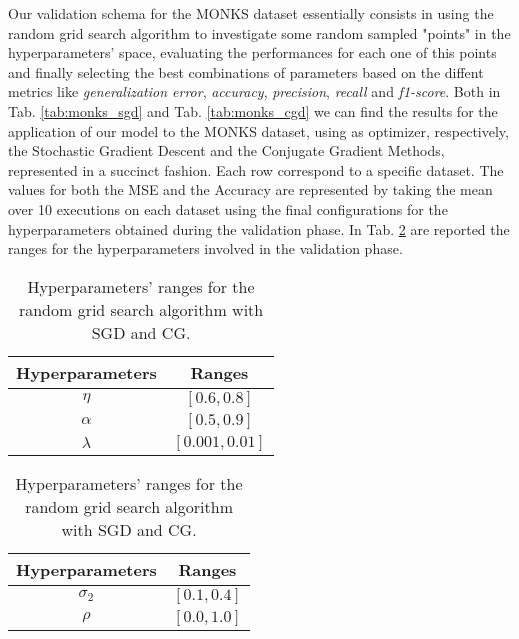         Our validation schema for the MONKS dataset essentially consists in using the random grid
        search
        algorithm to investigate some random sampled "points" in the hyperparameters' space, evaluating the
        performances for each one of this points and finally selecting the best combinations of parameters
        based
        on the diffent metrics like \textit{generalization error}, \textit{accuracy}, \textit{precision},
        \textit{recall} and \textit{f1-score}. Both in Tab. \ref{tab:monks_sgd} and Tab. 
        \ref{tab:monks_cgd} we can find the results for the application of our model to the MONKS dataset,
        using as optimizer, respectively, the Stochastic Gradient Descent and the Conjugate Gradient Methods,
        represented in a succinct fashion. Each row correspond to a specific dataset. The values for both the
        MSE and the Accuracy are represented by taking the mean over 10 executions on each dataset using
        the final configurations for the hyperparameters obtained during the validation phase.
        In Tab. \ref{tab:hyper_monk} are reported the ranges for the hyperparameters involved in the validation phase. 

        \begin{table}[H]
          \centering
          \caption{Hyperparameters' ranges for the random grid search algorithm with SGD and CG.}
          \begin{minipage}{.4\textwidth}
              \centering
              \begin{tabular}{cc}
                    \toprule
                    Hyperparameters & Ranges\\
                    \midrule
                    $\eta$ & $\left [0.6, 0.8 \right ]$\\

                    $\alpha$ & $[0.5, 0.9]$ \\

                    $\lambda$ & $[0.001, 0.01]$ \\

                    \midrule
              \end{tabular}
          \end{minipage}
          \begin{minipage}{.4\textwidth}
              \centering
              \begin{tabular}{cc}
                    \toprule
                    Hyperparameters & Ranges\\
                    \midrule
                    $\sigma_2$ & $\left [0.1, 0.4 \right ]$\\

                    $\rho$ & $[0.0, 1.0]$ \\

                    \midrule
              \end{tabular}
            \end{minipage}
            \label{tab:hyper_monk}
        \end{table}


